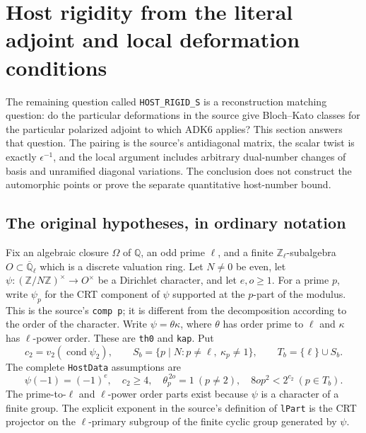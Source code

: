 \section{Host rigidity from the literal adjoint and local deformation conditions}
\label{sec:host-rigidity-v42}

The remaining question called \texttt{HOST\_RIGID\_S} is a
reconstruction matching question: do the particular deformations in
the source give Bloch--Kato classes for the particular polarized
adjoint to which ADK6 applies?  This section answers that question.
The pairing is the source's antidiagonal matrix, the scalar twist is
exactly $\epsilon^{-1}$, and the local argument includes arbitrary
dual-number changes of basis and unramified diagonal variations.
The conclusion does not construct the automorphic points or prove
the separate quantitative host-number bound.

\subsection{The original hypotheses, in ordinary notation}

Fix an algebraic closure $\Omega$ of $\mathbb Q$, an odd prime
$\ell$, and a finite $\mathbb Z_\ell$-subalgebra
$O\subset\overline{\mathbb Q}_\ell$ which is a discrete valuation
ring.  Let $N\ne0$ be even, let
$\psi:(\mathbb Z/N\mathbb Z)^\times\to O^\times$ be a Dirichlet
character, and let $e,o\ge1$.  For a prime $p$, write $\psi_p$ for
the CRT component of $\psi$ supported at the $p$-part of the modulus.
This is the source's \texttt{comp p}; it is different from the
decomposition according to the order of the character.  Write
$\psi=\theta\kappa$, where $\theta$ has order prime to $\ell$
and $\kappa$ has $\ell$-power order.  These are
\texttt{th0} and \texttt{kap}.  Put
\[
 c_2=v_2(\operatorname{cond}\psi_2),\qquad
 S_b=\{p\mid N:p\ne\ell,\ \kappa_p\ne1\},\qquad
 T_b=\{\ell\}\cup S_b.
 \tag{HSR.1}
\]
The complete \texttt{HostData} assumptions are
\[
 \psi(-1)=(-1)^e,\quad c_2\ge4,\quad
 \theta_p^{\,2o}=1\ (p\ne2),\quad
 8op^2<2^{c_2}\ (p\in T_b).
 \tag{HSR.2}
\]
The prime-to-$\ell$ and $\ell$-power order parts exist because
$\psi$ is a character of a finite group.  The explicit exponent
in the source's definition of \texttt{lPart} is the CRT projector
on the $\ell$-primary subgroup of the finite cyclic group generated
by $\psi$.

